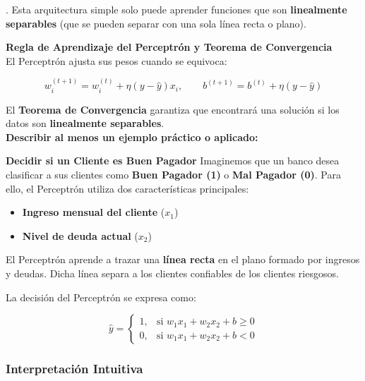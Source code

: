 \documentclass[letterpaper,12pt]{article}
\begin{document}
\begin{itemize}
\begin{figure}[H]
    \end{figure}

. Esta arquitectura simple solo puede aprender funciones que son \textbf{linealmente separables} (que se pueden separar con una sola línea recta o plano).


\newpage
\textbf{Regla de Aprendizaje del Perceptrón y Teorema de Convergencia}
\\
El Perceptrón ajusta sus pesos cuando se equivoca:

\[
w_i^{(t+1)} = w_i^{(t)} + \eta (y - \hat{y}) x_i,
\qquad
b^{(t+1)} = b^{(t)} + \eta (y - \hat{y})
\]

El \textbf{Teorema de Convergencia} garantiza que encontrará una solución si los datos son \textbf{linealmente separables}.
    \\
    
    \textbf{Describir al menos un ejemplo práctico o aplicado:}

    \vspace{0.1 cm}
    \textbf{Decidir si un Cliente es Buen Pagador}
    \vspace{0.1 cm}
    Imaginemos que un banco desea clasificar a sus clientes como \textbf{Buen Pagador (1)} o \textbf{Mal Pagador (0)}.  
    Para ello, el Perceptrón utiliza dos características principales:
    
    \begin{itemize}
        \item \textbf{Ingreso mensual del cliente} ($x_1$)
        \item \textbf{Nivel de deuda actual} ($x_2$)
    \end{itemize}
    
    El Perceptrón aprende a trazar una \textbf{línea recta} en el plano formado por ingresos y deudas.  
    Dicha línea separa a los clientes confiables de los clientes riesgosos.
    
    La decisión del Perceptrón se expresa como:
    
    \[
    \hat{y} =
    \begin{cases}
    1, & \text{si } w_1 x_1 + w_2 x_2 + b \ge 0 \\
    0, & \text{si } w_1 x_1 + w_2 x_2 + b < 0
    \end{cases}
    \]
    
    \subsubsection*{Interpretación Intuitiva}
    

\end{itemize}
\end{document}
